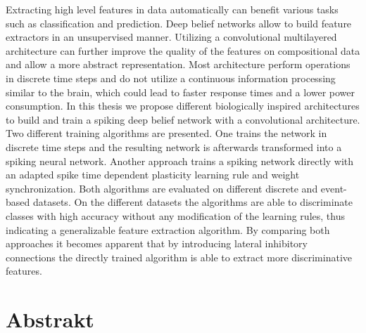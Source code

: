 
\abstract

Extracting high level features in data automatically can benefit various tasks such as classification and prediction. 
Deep belief networks allow to build feature extractors in an unsupervised manner. 
Utilizing a convolutional multilayered architecture can further improve the quality of the features on compositional data and allow a more abstract representation. 
Most architecture perform operations in discrete time steps and do not utilize a continuous information processing similar to the brain, which could lead to faster response times and a lower power consumption. 
In this thesis we propose different biologically inspired architectures to build and train a spiking deep belief network with a convolutional architecture. 
Two different training algorithms are presented.
One trains the network in discrete time steps and the resulting network is afterwards transformed into a spiking neural network.
Another approach trains a spiking network directly with an adapted spike time dependent plasticity learning rule and weight synchronization.
Both algorithms are evaluated on different discrete and event-based datasets.
On the different datasets the algorithms are able to discriminate classes with high accuracy without any modification of the learning rules, thus indicating a generalizable feature extraction algorithm.
By comparing both approaches it becomes apparent that by introducing lateral inhibitory connections the directly trained algorithm is able to extract more discriminative features.
 
\chapter*{Abstrakt}